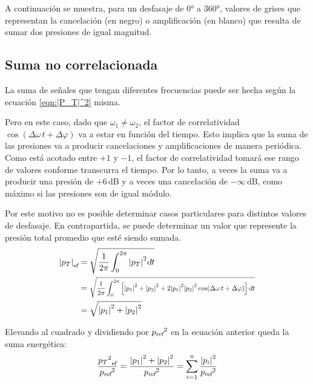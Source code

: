 \documentclass[a5paper,12pt,twoside]{book}
\begin{document}
A continuación se muestra, para un desfasaje de $\ang{0}$ a $\ang{360}$, valores de grises que representan la cancelación (en negro) o amplificación (en blanco) que resulta de sumar dos presiones de igual magnitud.

\begin{center}
    \def\svgwidth{0.5\linewidth}
    
\end{center}


\subsection{Suma no correlacionada}

La suma de señales que tengan diferentes frecuencias puede ser hecha según la ecuación \ref{eqn:|P_T|^2} misma.

Pero en este caso, dado que $\omega_1\neq\omega_2$, el factor de correlatividad $\cos(\Delta \omega \, t + \Delta \varphi)$ va a estar en función del tiempo. Esto implica que la suma de las presiones va a producir cancelaciones y amplificaciones de manera periódica. Como está acotado entre $+1$ y $-1$, el factor de correlatividad tomará ese rango de valores conforme transcurra el tiempo. Por lo tanto, a veces la suma va a producir una presión de $+6\,\si{\deci\bel}$ y a veces una cancelación de $-\infty\,\si{\deci\bel}$, como máximo si las presiones son de igual módulo.

Por este motivo no es posible determinar casos particulares para distintos valores de desfasaje. En contrapartida, se puede determinar un valor que represente la presión total promedio que esté siendo sumada.
\begin{align*}
    \rms{\norm{p_T}} &= \sqrt{\frac{1}{2\pi} \int_0^{2\pi} \norm{p_T}^2 \dif t}
    \\
    &= \scale{0.8}{\sqrt{\frac{1}{2\pi} \int_0^{2\pi} \left[ \norm{p_1}^2 + \norm{p_2}^2 + 2 \norm{p_1}^2 \norm{p_2}^2 \cos( \Delta \omega \, t + \Delta \varphi) \right] \dif t}}
    \\
    &= \sqrt{\norm{p_1}^2 + \norm{p_2}^2}
\end{align*}

Elevando al cuadrado y dividiendo por ${{p}_\textsl{{ref}}}^2$ en la ecuación anterior queda la suma energética:
\begin{equation*}
    \frac{{{{{p_T}^2}_\textsl{{ef}}}}}{{{p}_\textsl{{ref}}}^2} = \frac{{\left| {p_1} \right|}^2+{\left| {p_2} \right|}^2}{{{p}_\textsl{{ref}}}^2} = \sum_{i=1}^n \frac{{\left| {p_i} \right|}^2}{{{p}_\textsl{{ref}}}^2}
\end{equation*}
\end{document}
